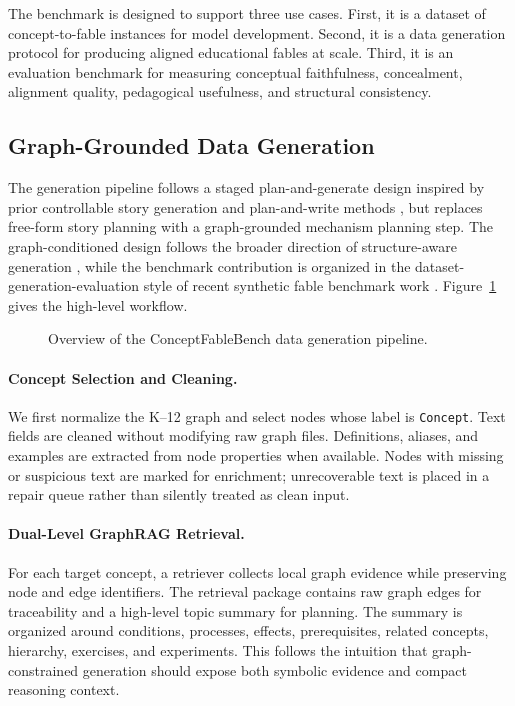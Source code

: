 \documentclass[letterpaper]{article} %
\begin{document}
The benchmark is designed to support three use cases. First, it is a dataset of concept-to-fable instances for model development. Second, it is a data generation protocol for producing aligned educational fables at scale. Third, it is an evaluation benchmark for measuring conceptual faithfulness, concealment, alignment quality, pedagogical usefulness, and structural consistency.

\subsection{Graph-Grounded Data Generation}

The generation pipeline follows a staged plan-and-generate design inspired by prior controllable story generation and plan-and-write methods \citep{arxiv1808_10113,arxiv1811_05701}, but replaces free-form story planning with a graph-grounded mechanism planning step. The graph-conditioned design follows the broader direction of structure-aware generation \citep{arxiv2410_16803}, while the benchmark contribution is organized in the dataset-generation-evaluation style of recent synthetic fable benchmark work \citep{arxiv2504_20605}. Figure~\ref{fig:pipeline} gives the high-level workflow.

\begin{figure}[t]
\centering
{}
\caption{Overview of the ConceptFableBench data generation pipeline.}
\label{fig:pipeline}
\end{figure}

\paragraph{Concept Selection and Cleaning.}
We first normalize the K--12 graph and select nodes whose label is \texttt{Concept}. Text fields are cleaned without modifying raw graph files. Definitions, aliases, and examples are extracted from node properties when available. Nodes with missing or suspicious text are marked for enrichment; unrecoverable text is placed in a repair queue rather than silently treated as clean input.

\paragraph{Dual-Level GraphRAG Retrieval.}
For each target concept, a retriever collects local graph evidence while preserving node and edge identifiers. The retrieval package contains raw graph edges for traceability and a high-level topic summary for planning. The summary is organized around conditions, processes, effects, prerequisites, related concepts, hierarchy, exercises, and experiments. This follows the intuition that graph-constrained generation should expose both symbolic evidence and compact reasoning context.
\end{document}
